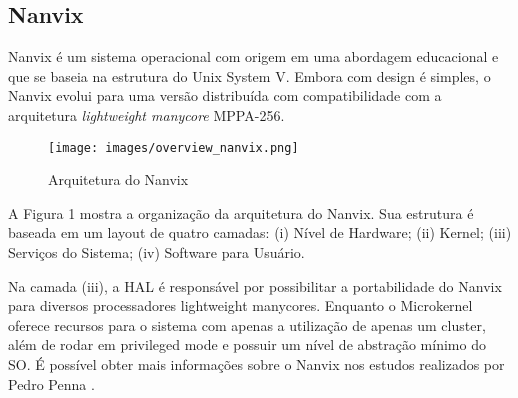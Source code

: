 \subsection{Nanvix}

Nanvix é um sistema operacional com origem em uma abordagem educacional \cite{NanvixEdu} e que se baseia na estrutura do Unix System V. Embora com design é simples, o Nanvix evolui para uma versão distribuída com compatibilidade com a arquitetura \textit{lightweight manycore} MPPA-256.

\begin{figure}[h!]
    \centering
    \texttt{[image: images/overview\_nanvix.png]}
    \caption{Arquitetura do Nanvix \\ \cite{penna:tel-03545212}}
\end{figure}

A Figura 1 mostra a organização da arquitetura do Nanvix. Sua estrutura é baseada em um layout de quatro camadas: (i) Nível de Hardware; (ii) Kernel; 
(iii) Serviços do Sistema; (iv) Software para Usuário.

Na camada (iii), a HAL é responsável por possibilitar a portabilidade do Nanvix para diversos processadores lightweight manycores. Enquanto o Microkernel 
oferece recursos para o sistema com apenas a utilização de apenas um cluster, além de rodar em privileged mode e possuir um nível de abstração mínimo do SO. 
É possível obter mais informações sobre o Nanvix nos estudos realizados por Pedro Penna \cite{penna:tel-03545212}.
